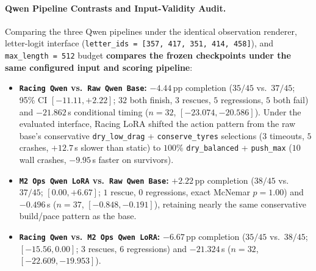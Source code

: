 \documentclass[11pt,a4paper]{article}
\begin{document}
\paragraph{Qwen Pipeline Contrasts and Input-Validity Audit.}
Comparing the three Qwen pipelines under the identical observation renderer, letter-logit interface (\texttt{letter\_ids = [357, 417, 351, 414, 458]}), and \texttt{max\_length = 512} budget \textbf{compares the frozen checkpoints under the same configured input and scoring pipeline}:
\begin{itemize}[leftmargin=1.5em,itemsep=2pt]
  \item \textbf{\texttt{Racing Qwen} vs.\ \texttt{Raw Qwen Base}:} $-4.44$\,pp completion ($35/45$ vs.\ $37/45$; 95\% CI $[-11.11, +2.22]$; $32$ both finish, $3$ rescues, $5$ regressions, $5$ both fail) and $-21.862$\,s conditional timing ($n=32$, $[-23.074, -20.586]$). Under the evaluated interface, Racing LoRA shifted the action pattern from the raw base's conservative \texttt{dry\_low\_drag} + \texttt{conserve\_tyres} selections ($3$ timeouts, $5$ crashes, $+12.7$\,s slower than static) to $100\%$ \texttt{dry\_balanced} + \texttt{push\_max} ($10$ wall crashes, $-9.95$\,s faster on survivors).
  \item \textbf{\texttt{M2 Ops Qwen LoRA} vs.\ \texttt{Raw Qwen Base}:} $+2.22$\,pp completion ($38/45$ vs.\ $37/45$; $[0.00, +6.67]$; $1$ rescue, $0$ regressions, exact McNemar $p = 1.00$) and $-0.496$\,s ($n=37$, $[-0.848, -0.191]$), retaining nearly the same conservative build/pace pattern as the base.
  \item \textbf{\texttt{Racing Qwen} vs.\ \texttt{M2 Ops Qwen LoRA}:} $-6.67$\,pp completion ($35/45$ vs.\ $38/45$; $[-15.56, 0.00]$; $3$ rescues, $6$ regressions) and $-21.324$\,s ($n=32$, $[-22.609, -19.953]$).
\end{itemize}
\end{document}
